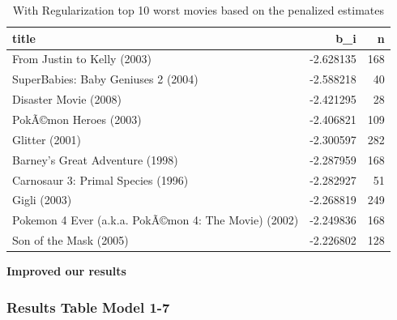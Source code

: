 \documentclass[
]{article}
\newenvironment{Shaded}{}{}
\newcommand{\AttributeTok}[1]{\textcolor[rgb]{0.49,0.56,0.16}{#1}}
\newcommand{\DecValTok}[1]{\textcolor[rgb]{0.25,0.63,0.44}{#1}}
\newcommand{\FloatTok}[1]{\textcolor[rgb]{0.25,0.63,0.44}{#1}}
\newcommand{\FunctionTok}[1]{\textcolor[rgb]{0.02,0.16,0.49}{#1}}
\newcommand{\NormalTok}[1]{#1}
\newcommand{\OtherTok}[1]{\textcolor[rgb]{0.00,0.44,0.13}{#1}}
\newcommand{\SpecialCharTok}[1]{\textcolor[rgb]{0.25,0.44,0.63}{#1}}
\newcommand{\StringTok}[1]{\textcolor[rgb]{0.25,0.44,0.63}{#1}}
\begin{document}
\begin{table}[H]

\caption{\label{tab:m7_5}With Regularization top 10 worst movies based on the penalized estimates\label{tbl:with_regularization_top_10_worst_movies_based_on_the_penalized_estimates}}
\centering
\begin{tabular}[t]{lrr}
\toprule
title & b\_i & n\\
\midrule
From Justin to Kelly (2003) & -2.628135 & 168\\
SuperBabies: Baby Geniuses 2 (2004) & -2.588218 & 40\\
Disaster Movie (2008) & -2.421295 & 28\\
PokÃ©mon Heroes (2003) & -2.406821 & 109\\
Glitter (2001) & -2.300597 & 282\\
Barney's Great Adventure (1998) & -2.287959 & 168\\
Carnosaur 3: Primal Species (1996) & -2.282927 & 51\\
Gigli (2003) & -2.268819 & 249\\
Pokemon 4 Ever (a.k.a. PokÃ©mon 4: The Movie) (2002) & -2.249836 & 168\\
Son of the Mask (2005) & -2.226802 & 128\\
\bottomrule
\end{tabular}
\end{table}

\textbf{Improved our results}

\begin{Shaded}
\end{Shaded}

\newpage

\hypertarget{results-table-model-1-7}{%
\subsubsection{Results Table Model 1-7}\label{results-table-model-1-7}}
\end{document}
